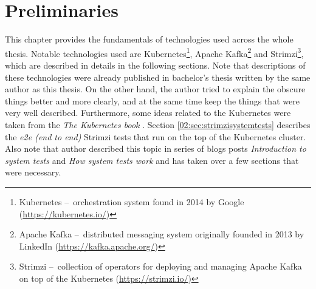 \chapter{Preliminaries}

This chapter provides the fundamentals of technologies used across the whole thesis. Notable technologies used are Kubernetes\footnote{Kubernetes \---\ orchestration system found in 2014 by Google (\url{https://kubernetes.io/})}, Apache Kafka\footnote{Apache Kafka \---\ distributed messaging system originally founded in 2013 by LinkedIn (\url{https://kafka.apache.org/})} and Strimzi\footnote{Strimzi \---\ collection of operators for deploying and managing Apache Kafka on top of the Kubernetes (\url{https://strimzi.io/})}, which are described in details in the following sections. Note that descriptions of these technologies were already published in bachelor's thesis \cite{02-bachelor-thesis} written by the same author as this thesis. On the other hand, the author tried to explain the obscure things better and more clearly, and at the same time keep the things that were very well described. Furthermore, some ideas related to the Kubernetes were taken from the \emph{The Kubernetes book} \cite{kubernetesBook}. 
Section \ref{02:sec:strimzisystemtests} describes the \emph{e2e (end to end)}  Strimzi tests that run on the top of the Kubernetes cluster. Also note that author described this topic in series of blogs posts \emph{Introduction to system tests} \cite{02-blogpost-introduction-to-systemtest} and \emph{How system tests work} \cite{02-blogpost-how-systemtest-work} and has taken over a few sections that were necessary.